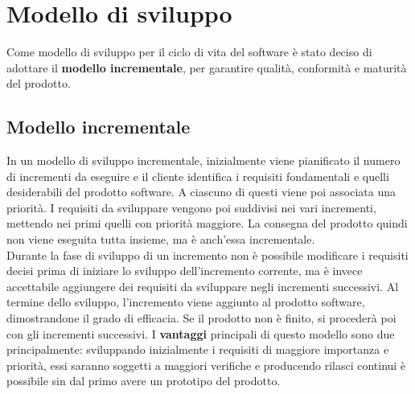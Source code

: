 \documentclass[PianoDiProgetto.tex]{subfiles}
\begin{document}
\chapter{Modello di sviluppo}
Come modello di sviluppo per il ciclo di vita del software è stato deciso di adottare il \textbf{modello incrementale}, per garantire qualità, conformità e maturità del prodotto.

\section{Modello incrementale}
In un modello di sviluppo incrementale, inizialmente viene pianificato il numero di incrementi da eseguire e il cliente identifica i requisiti fondamentali e quelli desiderabili del prodotto software. A ciascuno di questi viene poi associata una priorità. I requisiti da sviluppare vengono poi suddivisi nei vari incrementi, mettendo nei primi quelli con priorità maggiore. La consegna del prodotto quindi non viene eseguita tutta insieme, ma è anch'essa incrementale.\\
Durante la fase di sviluppo di un incremento non è possibile modificare i requisiti decisi prima di iniziare lo sviluppo dell'incremento corrente, ma è invece accettabile aggiungere dei requisiti da sviluppare negli incrementi successivi. Al termine dello sviluppo, l'incremento viene aggiunto al prodotto software, dimostrandone il grado di efficacia. Se il prodotto non è finito, si procederà poi con gli incrementi successivi. I \textbf{vantaggi} principali di questo modello sono due principalmente: sviluppando inizialmente i requisiti di maggiore importanza e priorità, essi saranno soggetti a maggiori verifiche e producendo rilasci continui è possibile sin dal primo avere un prototipo del prodotto.
\end{document}
